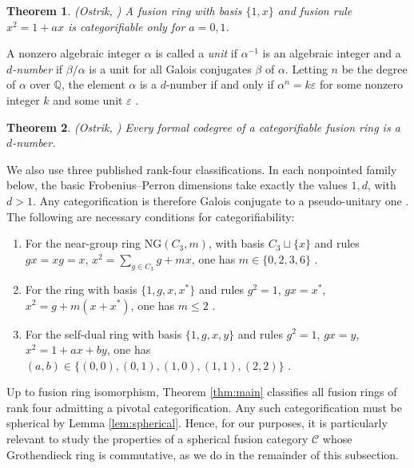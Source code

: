 \documentclass[11pt]{amsart}
\newtheorem{theorem}{Theorem}[section]
\theoremstyle{definition}
\newcommand{\Q}{\mathbb Q}
\newcommand{\Near}{\mathrm{NG}}
\numberwithin{equation}{section}
\begin{document}
\begin{theorem} \label{prop:subring-Fibo} \textnormal{(Ostrik, \cite[Main Theorem, p.~178]{OstrikRank2})}
A fusion ring with basis $\{1,x\}$ and fusion rule $x^2=1+ax$ is
categorifiable only for $a=0,1$. 
\end{theorem}

A nonzero algebraic integer $\alpha$ is called a \textit{unit} if $\alpha^{-1}$ is an algebraic integer and a \textit{$d$-number} if $\beta/\alpha$ is a unit for all Galois conjugates $\beta$ of $\alpha$. 
Letting $n$ be the degree of $\alpha$ over $\Q$, the element $\alpha$ is a $d$-number if and only if $\alpha^n=k\varepsilon$ for some nonzero integer $k$ and some unit $\varepsilon$ \cite[Lemma~2.7(iv)]{OstrikCodegrees}. 

\begin{theorem} \label{prop:d-number} \textnormal{(Ostrik, \cite[Theorem~1.2]{OstrikCodegrees})}
Every formal codegree of a categorifiable fusion ring is a $d$-number. 
\end{theorem} 

We also use three published rank-four classifications. In each nonpointed
family below, the basic Frobenius--Perron dimensions take exactly the
values $1,d$, with $d>1$. Any categorification is therefore Galois
conjugate to a pseudo-unitary one \cite[Lemma~3.1]{Schopieray}.
The following are necessary conditions for categorifiability:
\begin{enumerate}
\item For the near-group ring $\Near(C_3,m)$, with basis $C_3\sqcup\{x\}$
and rules $gx=xg=x$, $x^2=\sum_{g\in C_3}g+mx$, one has
$m\in\{0,2,3,6\}$ \cite[Theorem~1.1]{Larson}.
\item For the ring with basis $\{1,g,x,x^*\}$ and rules
$g^2=1$, $gx=x^*$, $x^2=g+m(x+x^*)$, one has $m\leq2$
\cite[Theorem~1.1]{Larson}.
\item For the self-dual ring with basis $\{1,g,x,y\}$ and rules
$g^2=1$, $gx=y$, $x^2=1+ax+by$, one has
$(a,b)\in\{(0,0),(0,1),(1,0),(1,1),(2,2)\}$
\cite[Theorem~2.4]{EIP}.
\end{enumerate}

Up to fusion ring isomorphism, Theorem \ref{thm:main} classifies all fusion rings of rank four admitting a pivotal categorification.
Any such categorification must be spherical by Lemma \ref{lem:spherical}. 
Hence, for our purposes, it is particularly relevant to study the properties of a spherical fusion category $\mathcal{C}$ whose Grothendieck ring is commutative, as we do in the remainder of this subsection. 
\end{document}
